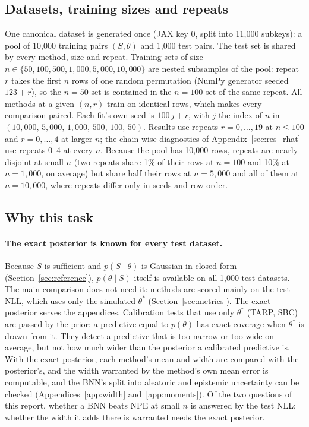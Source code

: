 \documentclass[11pt]{article}
\begin{document}
\subsection{Datasets, training sizes and repeats}
\label{sec:datasets}
One canonical dataset is generated once (JAX key 0, split into 11{,}000 subkeys): a pool of 10{,}000 training
pairs $(S,\theta)$ and 1{,}000 test pairs. The test set is shared by every method, size and repeat. Training
sets of size $n\in\{50,100,500,1{,}000,5{,}000,10{,}000\}$ are nested subsamples of the pool: repeat $r$ takes the
first $n$ rows of one random permutation (NumPy generator seeded $123+r$), so the $n=50$ set is contained in the
$n=100$ set of the same repeat. All methods at a given $(n,r)$ train on identical rows, which makes every
comparison paired. Each fit's own seed is $100\,j+r$, with $j$ the index of $n$ in
$(10{,}000,\,5{,}000,\,1{,}000,\,500,\,100,\,50)$. Results use repeats $r=0,\dots,19$ at $n\le100$ and $r=0,\dots,4$
at larger $n$; the chain-wise diagnostics of Appendix~\ref{sec:res_rhat} use repeats 0--4 at every $n$. Because the pool has 10{,}000 rows,
repeats are nearly disjoint at small $n$ (two repeats share 1\% of their rows at $n=100$ and 10\% at $n=1{,}000$, on
average) but share half their rows at $n=5{,}000$ and all of them at $n=10{,}000$, where repeats differ only in seeds
and row order.

\subsection{Why this task}
\label{sec:why_task}

\paragraph{The exact posterior is known for every test dataset.}
Because $S$ is sufficient and $p(S\mid\theta)$ is Gaussian in closed form (Section~\ref{sec:reference}),
$p(\theta\mid S)$ itself is available on all 1{,}000 test datasets. The main comparison does not need it: methods are
scored mainly on the test NLL, which uses only the simulated $\theta^\ast$ (Section~\ref{sec:metrics}). The exact
posterior serves the appendices. Calibration tests that use only $\theta^\ast$ (TARP, SBC) are passed by the prior: a predictive
equal to $p(\theta)$ has exact coverage when $\theta^\ast$ is drawn from it. They detect a predictive that is too
narrow or too wide on average, but not how much wider than the posterior a calibrated predictive is. With the exact
posterior, each method's mean and width are compared with the posterior's, and the width warranted by the
method's own mean error is computable, and the BNN's split into aleatoric and epistemic uncertainty can be checked
(Appendices~\ref{app:width} and~\ref{app:moments}). Of the two questions of this report, whether a BNN beats NPE at
small $n$ is answered by the test NLL; whether the width it adds there is warranted needs the exact posterior.
\end{document}
